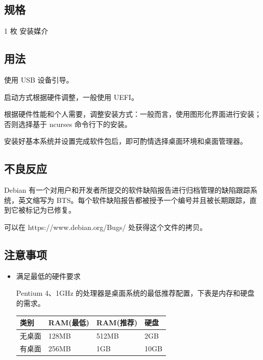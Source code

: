 \documentclass{article}
\begin{document}
\begin{multicols*}{3}
	\begin{tcolorbox}
	\section*{规格}
	\end{tcolorbox}

	1 枚 安装媒介

	\medskip

	\begin{tcolorbox}
	\section*{用法}
	\end{tcolorbox}

	使用 USB 设备引导。

	启动方式根据硬件调整，一般使用 UEFI。

	根据硬件性能和个人需要，调整安装方式：一般而言，使用图形化界面进行安装；否则选择基于 ncurses 命令行下的安装。

	安装好基本系统并设置完成软件包后，即可酌情选择桌面环境和桌面管理器。

	\medskip

	\begin{tcolorbox}
	\section*{不良反应}
	\end{tcolorbox}

	Debian 有一个对用户和开发者所提交的软件缺陷报告进行归档管理的缺陷跟踪系统，英文缩写为 BTS。每个软件缺陷报告都被授予一个编号并且被长期跟踪，直到它被标记为已修复。

	可以在 https://www.debian.org/Bugs/ 处获得这个文件的拷贝。

	\medskip


	\begin{tcolorbox}
	\section*{注意事项}
	\end{tcolorbox}
	\begin{itemize}[leftmargin=*]

		\item 满足最低的硬件要求

		Pentium 4、1GHz 的处理器是桌面系统的最低推荐配置，下表是内存和硬盘的需求。

		{\small\begin{tabularx}{\linewidth}{|X|X|X|X|}
			\hline
			类别 & RAM\newline (最低) & RAM\newline (推荐) & 硬盘 \\
			\hline
			无桌面 & 128MB & 512MB & 2GB \\
			\hline
			有桌面 & 256MB & 1GB & 10GB \\
			\hline
		\end{tabularx}}


\end{itemize}
\end{multicols*}
\end{document}
